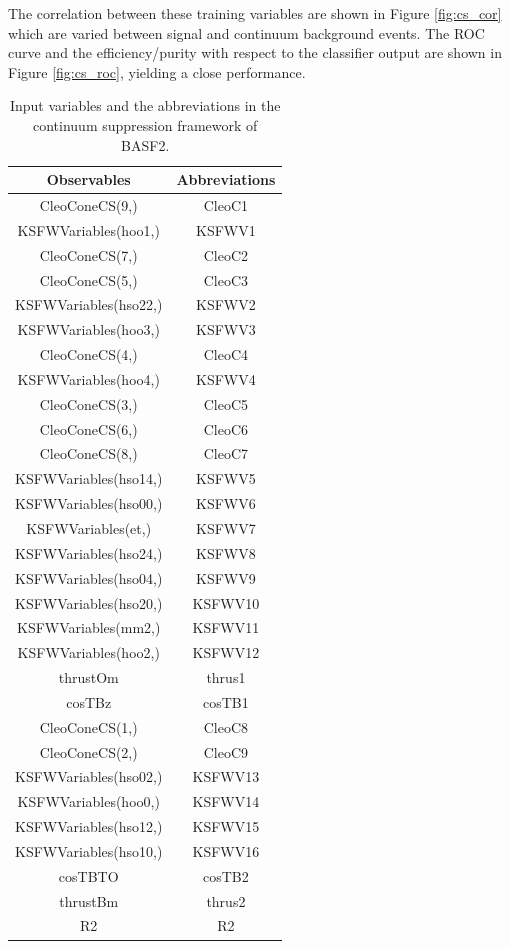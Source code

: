 The correlation between these training variables are shown in Figure \ref{fig:cs_cor} which are varied between signal and continuum background events. The ROC curve and the efficiency/purity with respect to the classifier output are shown in Figure \ref{fig:cs_roc}, yielding a close performance.
\begin{table}[htpb]
	\begin{minipage}[t]{1\linewidth}
		\centering
		\caption{Input variables and the abbreviations in the continuum suppression framework of BASF2.}
		\label{tab:cs_abr}
		\begin{tabular}{c|c}
			\hline
			Observables &  Abbreviations\\
			\hline
			CleoConeCS(9,) &  CleoC1 \\
			KSFWVariables(hoo1,) & KSFWV1 \\
			CleoConeCS(7,) & CleoC2\\
			CleoConeCS(5,) & CleoC3\\
			KSFWVariables(hso22,) & KSFWV2\\
			KSFWVariables(hoo3,) & KSFWV3\\
			CleoConeCS(4,) & CleoC4 \\
			KSFWVariables(hoo4,) &  KSFWV4\\
			CleoConeCS(3,) & CleoC5 \\
			CleoConeCS(6,) & CleoC6\\
			CleoConeCS(8,) & CleoC7\\
			KSFWVariables(hso14,) &   KSFWV5\\
			KSFWVariables(hso00,) & KSFWV6\\
			KSFWVariables(et,) & KSFWV7\\
			KSFWVariables(hso24,) & KSFWV8\\
			KSFWVariables(hso04,) & KSFWV9\\
			KSFWVariables(hso20,) & KSFWV10 \\
			KSFWVariables(mm2,)  & KSFWV11\\
			KSFWVariables(hoo2,) &  KSFWV12\\
			thrustOm & thrus1 \\
			cosTBz & cosTB1\\
			CleoConeCS(1,) & CleoC8 \\
			CleoConeCS(2,) & CleoC9 \\
			KSFWVariables(hso02,) &  KSFWV13\\
			KSFWVariables(hoo0,) &  KSFWV14 \\
			KSFWVariables(hso12,) &  KSFWV15\\
			KSFWVariables(hso10,) & KSFWV16\\
			cosTBTO & cosTB2\\
			thrustBm & thrus2\\
			R2 & R2\\
			\hline
		\end{tabular}
	\end{minipage}
\end{table}

